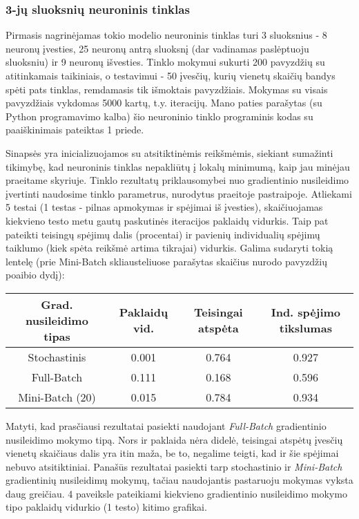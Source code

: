\documentclass[a4paper,12pt]{article}
\begin{document}
\subsubsection{3-jų sluoksnių neuroninis tinklas}
Pirmasis nagrinėjamas tokio modelio neuroninis tinklas turi 3 sluoksnius - 8 neuronų įvesties, 25 neuronų antrą sluoksnį (dar vadinamas paslėptuoju sluoksniu) ir 9 neuronų išvesties. Tinklo mokymui sukurti 200 pavyzdžių su atitinkamais taikiniais, o testavimui - 50 įvesčių, kurių vienetų skaičių bandys spėti pats tinklas, remdamasis tik išmoktais pavyzdžiais. Mokymas su visais pavyzdžiais vykdomas 5000 kartų, t.y. iteracijų. Mano paties parašytas (su Python programavimo kalba) šio neuroninio tinklo programinis kodas su paaiškinimais pateiktas 1 priede.

Sinapsės yra inicializuojamos su atsitiktinėmis reikšmėmis, siekiant sumažinti tikimybę, kad neuroninis tinklas nepakliūtų į lokalų minimumą, kaip jau minėjau praeitame skyriuje. Tinklo rezultatų priklausomybei nuo gradientinio nusileidimo įvertinti naudosime tinklo parametrus, nurodytus praeitoje pastraipoje. Atliekami 5 testai (1 testas - pilnas apmokymas ir spėjimai iš įvesties), skaičiuojamas kiekvieno testo metu gautų paskutinės iteracijos paklaidų vidurkis. Taip pat pateikti teisingų spėjimų dalis (procentai) ir pavienių individualių spėjimų taiklumo (kiek spėta reikšmė artima tikrajai) vidurkis. Galima sudaryti tokią lentelę (prie Mini-Batch skliausteliuose parašytas skaičius nurodo pavyzdžių poaibio dydį):
\medskip
\begin{center}
\begin{tabular}{ | c | c | c | c | }
	\hline
	Grad. nusileidimo tipas & Paklaidų vid. & Teisingai atspėta & Ind. spėjimo tikslumas \\ \hline
	Stochastinis & 0.001 & 0.764 & 0.927 \\ \hline
	Full-Batch & 0.111 & 0.168 & 0.596\\ \hline
	Mini-Batch (20) & 0.015 & 0.784 & 0.934\\
	\hline
\end{tabular}
\end{center}
\medskip
\indent\indent
Matyti, kad prasčiausi rezultatai pasiekti naudojant \textit{Full-Batch} gradientinio nusileidimo mokymo tipą. Nors ir paklaida nėra didelė, teisingai atspėtų įvesčių vienetų skaičiaus dalis yra itin maža, be to, negalime teigti, kad ir šie spėjimai nebuvo atsitiktiniai. Panašūs rezultatai pasiekti tarp stochastinio ir \textit{Mini-Batch} gradientinių nusileidimų mokymų, tačiau naudojantis pastaruoju mokymas vyksta daug greičiau. 4 paveiksle pateikiami kiekvieno gradientinio nusileidimo mokymo tipo paklaidų vidurkio (1 testo) kitimo grafikai. 
\end{document}
